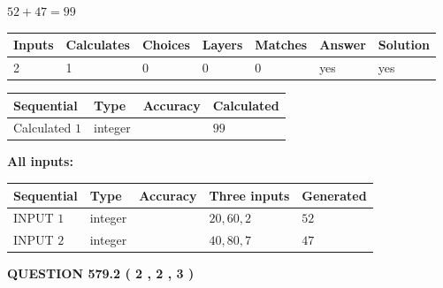 \documentclass[12pt]{article}
\begin{document}
 

$ %
52 +  %
47=   %
99$
 
 
\noindent{}
 
 

 
   
   
   
   
\noindent\begin{tabular}{|l|l|l|l|l|l|l|}
 \hline
Inputs & Calculates & Choices & Layers & Matches & Answer & Solution \\ \hline
 2  & 
 1  & 
 0
  & 
 0  & 
 0  & 
  yes & 
  yes 
  \\ \hline
 \end{tabular}
   
   
   
   
\noindent{}
   
   
  
  
\noindent\begin{tabular}{|l|l|l|l|}
\hline
 Sequential & Type & Accuracy & Calculated \\ 
\hline
 
 
  Calculated $  1 $ & integer &  & 
  $ 99 $ 
 \\  \hline  
 \end{tabular}
   
   
   
   
\noindent\vspace{0.1in}\hspace{-0.08in} {\textbf{\Large{All inputs: }}}
   
   
  
  
\noindent\begin{tabular}{|l|l|l|l|l|}
\hline
 Sequential & Type & Accuracy & Three inputs & Generated \\ 
\hline
 
 
  INPUT $  1 $ & integer &  & $
 20
 , 
 60
 , 
 2
 $ & $ 52 $ 
 \\  \hline  
 
 
  INPUT $  2 $ & integer &  & $
 40
 , 
 80
 , 
 7
 $ & $ 47 $ 
 \\  \hline  
 \end{tabular}
   
   
  
\vspace{0.2in}
  
{\textbf{\Large{QUESTION
579.2 
 ( 2 , 2 , 3 )
}}}
  
\end{document}
